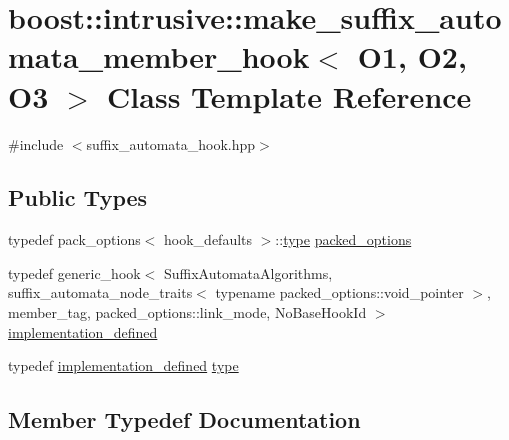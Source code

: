 \hypertarget{classboost_1_1intrusive_1_1make__suffix__automata__member__hook}{}\section{boost\+:\+:intrusive\+:\+:make\+\_\+suffix\+\_\+automata\+\_\+member\+\_\+hook$<$ O1, O2, O3 $>$ Class Template Reference}
\label{classboost_1_1intrusive_1_1make__suffix__automata__member__hook}


{\ttfamily \#include $<$suffix\+\_\+automata\+\_\+hook.\+hpp$>$}

\subsection*{Public Types}
\begin{DoxyCompactItemize}
\item 
typedef pack\+\_\+options$<$ hook\+\_\+defaults $>$\+::\hyperlink{classboost_1_1intrusive_1_1make__suffix__automata__member__hook_a01166563956b1d994be6c34cba43efc1}{type} \hyperlink{classboost_1_1intrusive_1_1make__suffix__automata__member__hook_aa4b18a9fa9fc8cac2b6cb46a3cf806cb}{packed\+\_\+options}
\item 
typedef generic\+\_\+hook$<$ Suffix\+Automata\+Algorithms, suffix\+\_\+automata\+\_\+node\+\_\+traits$<$ typename packed\+\_\+options\+::void\+\_\+pointer $>$, member\+\_\+tag, packed\+\_\+options\+::link\+\_\+mode, No\+Base\+Hook\+Id $>$ \hyperlink{classboost_1_1intrusive_1_1make__suffix__automata__member__hook_aca176c172e71c868f0cbcfbd2d1d6577}{implementation\+\_\+defined}
\item 
typedef \hyperlink{classboost_1_1intrusive_1_1make__suffix__automata__member__hook_aca176c172e71c868f0cbcfbd2d1d6577}{implementation\+\_\+defined} \hyperlink{classboost_1_1intrusive_1_1make__suffix__automata__member__hook_a01166563956b1d994be6c34cba43efc1}{type}
\end{DoxyCompactItemize}


\subsection{Member Typedef Documentation}
\mbox{\label{classboost_1_1intrusive_1_1make__suffix__automata__member__hook_aca176c172e71c868f0cbcfbd2d1d6577}} 
